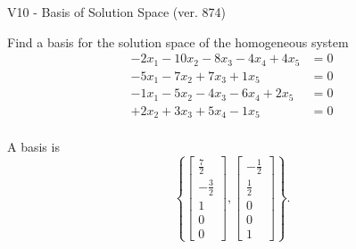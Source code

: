 \begin{exercise}
  \begin{exerciseTitle}V10 - Basis of Solution Space (ver. 874)\end{exerciseTitle}
  \begin{exerciseStatement}
    Find a basis for the solution space of the homogeneous system 
\begin{align*}
 -2 x_ 1 -10 x_ 2 -8 x_ 3 -4 x_ 4 + 4 x_ 5 &= 0  \\ 
  -5 x_ 1 -7 x_ 2 + 7 x_ 3 + 1 x_ 5 &= 0  \\ 
  -1 x_ 1 -5 x_ 2 -4 x_ 3 -6 x_ 4 + 2 x_ 5 &= 0  \\ 
  + 2 x_ 2 + 3 x_ 3 + 5 x_ 4 -1 x_ 5 &= 0  \\ 
 \end{align*}


 
  \end{exerciseStatement}

  \begin{exerciseAnswer}
   A basis is   
\[\left\{\left[\begin{array}{c}
\frac{7}{2} \\
-\frac{3}{2} \\
1 \\
0 \\
0
\end{array}\right] , \left[\begin{array}{c}
-\frac{1}{2} \\
\frac{1}{2} \\
0 \\
0 \\
1
\end{array}\right]\right\}.\]

  


  \end{exerciseAnswer}
\end{exercise}